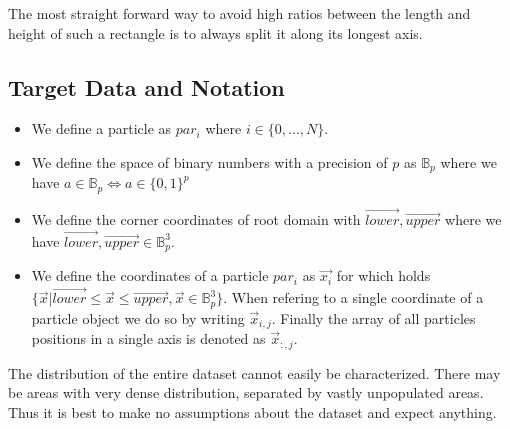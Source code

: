 \documentclass[]{article}
\begin{document}
The most straight forward way to avoid high ratios between the length and height of such a rectangle is to always split it along its longest axis.


\subsection{Target Data and Notation}\label{section:target-data}

\begin{comment}
The target data consists of $N$ particles where we use the following notations:

constrained realization
Gaussian random distribution, modified to match the measured power.

The higher the resolution the more accurate the result.

Large scales are more uniform, small scale 

smallest thing you want to be able to resolve. 

boxes around a giga parsec

want to be able to resolve galaxies, milky way 10^12 solar masses,

want to be able to resolve smaller galaxies, 10^8 for a single particle
Imp 
\end{comment}

\begin{itemize}
	\item We define a particle as $par_i$  where $i \in \{0,...,N\}$. 
	\item We define the space of binary numbers with a precision of $p$ as $\mathbb{B}_p$ where we have $a \in \mathbb{B}_p \Leftrightarrow a \in \{0,1\}^{p}$
	\item We define the corner coordinates of root domain with $\vec{lower}, \vec{upper}$ where we have $\vec{lower}, \vec{upper} \in \mathbb{B}_p^3$. 
	\item We define the coordinates of a particle $par_i$ as $\vec{x_i}$ for which holds $\{\vec{x} | \vec{lower} \leq \vec{x} \leq \vec{upper}, \vec{x} \in \mathbb{B}_p^3 \}$.
	When refering to a single coordinate of a particle object we do so by writing $\vec{x}_{i,j}$. Finally the array of all particles positions in a single axis is denoted as $\vec{x}_{:,j}$. 
	
\end{itemize}

The distribution of the entire dataset cannot easily be characterized. There may be areas with very dense distribution, separated by vastly unpopulated areas. Thus it is best to make no assumptions about the dataset and expect anything.
\end{document}
